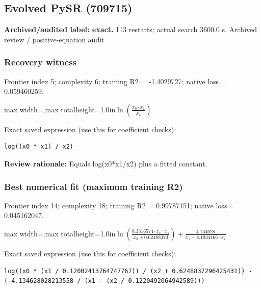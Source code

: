 \documentclass[10pt,letterpaper,landscape]{article}
\begin{document}
\begin{minipage}[t]{0.485\textwidth}
\subsection*{Evolved PySR (709715)}
\textbf{Archived/audited label: exact.} 113 restarts; actual search 3600.0 s.
{\small Archived review / positive-equation audit}
\subsubsection*{Recovery witness}
Frontier index 5; complexity 6; training R2 = -1.4029727; native loss = 0.059460259.
\begin{center}\begin{adjustbox}{max width=\linewidth,max totalheight=1.0in}$\displaystyle \ln{\left(\frac{x_{0} \cdot x_{1}}{x_{2}} \right)}$\end{adjustbox}\end{center}
{\scriptsize Exact saved expression (use this for coefficient checks):}
\begin{lstlisting}
log((x0 * x1) / x2)
\end{lstlisting}
{\small\textbf{Review rationale:} Equals log(x0*x1/x2) plus a fitted constant.}
\subsubsection*{Best numerical fit (maximum training R2)}
Frontier index 14; complexity 18; training R2 = 0.99787151; native loss = 0.045162047.
\begin{center}\begin{adjustbox}{max width=\linewidth,max totalheight=1.0in}$\displaystyle \ln{\left(\frac{8.3316574 \cdot x_{0} \cdot x_{1}}{x_{2} + 0.62488373} \right)} + \frac{4.134628}{x_{1} - 8.1934166 \cdot x_{2}}$\end{adjustbox}\end{center}
{\scriptsize Exact saved expression (use this for coefficient checks):}
\begin{lstlisting}
log((x0 * (x1 / 0.12002413764747767)) / (x2 + 0.6248837296425431)) - (-4.134628028213558 / (x1 - (x2 / 0.1220492064942589)))
\end{lstlisting}
\end{minipage}
\clearpage{}\label{ideal_gas-10001}
\end{document}

